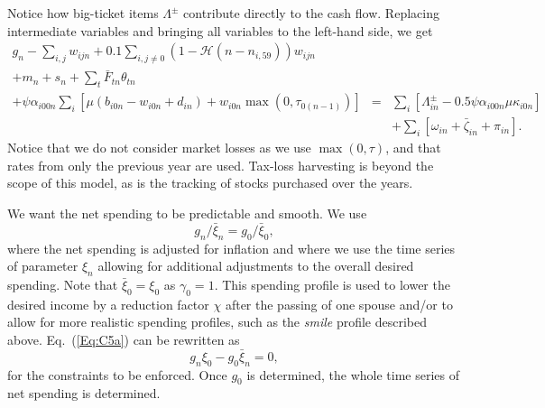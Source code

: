 \documentclass{report}[fleqn,11pt]
\begin{document}
	Notice how big-ticket items $\Lambda^\pm$ contribute directly to the cash flow.
	Replacing intermediate variables and bringing all variables to the left-hand side, we get
	\begin{eqnarray}
		\label{Eq:C4}
		g_n - \sum_{i,j} w_{ijn} + 0.1 \sum_{i,j\neq0} (1-\mathcal{H}(n - n_{i, 59})) w_{ijn}\nonumber\\
                + m_n + s_n + \sum_t \bar{F}_{tn} \theta_{t n} &&\nonumber \\
		+ \psi\alpha_{i00n} \sum_i \left[\mu(b_{i0n} - w_{i0n} + d_{in})
		+ w_{i0n}\max(0, \tau_{0(n-1)})\right] 
		&=& \sum_i [\Lambda^\pm_{in} - 0.5\psi\alpha_{i00n}\mu\kappa_{i0n}] \nonumber\\
                && + \sum_i [\omega_{in} + \bar{\zeta}_{in} + \pi_{in} ].
	\end{eqnarray}
	Notice that we do not consider market losses as we use $\max(0, \tau)$, and that
	rates from only the previous year are used. Tax-loss
	harvesting is beyond the scope of this model, as is the tracking of stocks
	purchased over the years.

	We want the net spending to be predictable and smooth. We use
\begin{equation}
	\label{Eq:C5a}
	g_{n}/\bar{\xi}_{n} = g_0/\bar{\xi}_0,
\end{equation}
where the net spending is adjusted for inflation and where we use the time series of parameter $\xi_n$ 
allowing for additional adjustments to the overall desired spending.
Note that $\bar{\xi}_0 = \xi_0$ as $\gamma_0=1$.
This spending profile is used to lower the desired income by a reduction factor $\chi$
after the passing of one spouse and/or to allow for more realistic spending profiles, such as
the {\em smile} profile described above.
Eq.~(\ref{Eq:C5a}) can be rewritten as
\begin{equation}
	\label{Eq:C5}
	g_n \xi_0 - g_0 \bar{\xi}_n = 0,
\end{equation}
for the constraints to be enforced. Once $g_0$ is determined, the whole time series of net spending
is determined.
\end{document}
